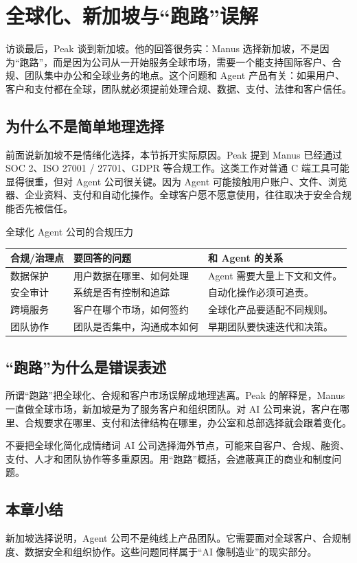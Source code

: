 \section{全球化、新加坡与“跑路”误解}

访谈最后，Peak 谈到新加坡。他的回答很务实：Manus 选择新加坡，不是因为“跑路”，而是因为公司从一开始服务全球市场，需要一个能支持国际客户、合规、团队集中办公和全球业务的地点。这个问题和 Agent 产品有关：如果用户、客户和支付都在全球，团队就必须提前处理合规、数据、支付、法律和客户信任。

\subsection{为什么不是简单地理选择}

前面说新加坡不是情绪化选择，本节拆开实际原因。Peak 提到 Manus 已经通过 SOC 2、ISO 27001 / 27701、GDPR 等合规工作。这类工作对普通 C 端工具可能显得很重，但对 Agent 公司很关键。因为 Agent 可能接触用户账户、文件、浏览器、企业资料、支付和自动化操作。全球客户愿不愿意使用，往往取决于安全合规能否先被信任。

\begin{knowledgebox}{全球化 Agent 公司的合规压力}
\begin{tabularx}{\textwidth}{p{}p{}X}
\toprule
合规/治理点 & 要回答的问题 & 和 Agent 的关系 \\
\midrule
数据保护 & 用户数据在哪里、如何处理 & Agent 需要大量上下文和文件。 \\
安全审计 & 系统是否有控制和追踪 & 自动化操作必须可追责。 \\
跨境服务 & 客户在哪个市场，如何签约 & 全球化产品要适配不同规则。 \\
团队协作 & 团队是否集中，沟通成本如何 & 早期团队要快速迭代和决策。 \\
\bottomrule
\end{tabularx}
\end{knowledgebox}

\subsection{“跑路”为什么是错误表述}

所谓“跑路”把全球化、合规和客户市场误解成地理逃离。Peak 的解释是，Manus 一直做全球市场，新加坡是为了服务客户和组织团队。对 AI 公司来说，客户在哪里、合规要求在哪里、支付和法律结构在哪里，办公室和总部选择就会跟着变化。

\begin{warningbox}{不要把全球化简化成情绪词}
AI 公司选择海外节点，可能来自客户、合规、融资、支付、人才和团队协作等多重原因。用“跑路”概括，会遮蔽真正的商业和制度问题。
\end{warningbox}

\subsection{本章小结}

新加坡选择说明，Agent 公司不是纯线上产品团队。它需要面对全球客户、合规制度、数据安全和组织协作。这些问题同样属于“AI 像制造业”的现实部分。

